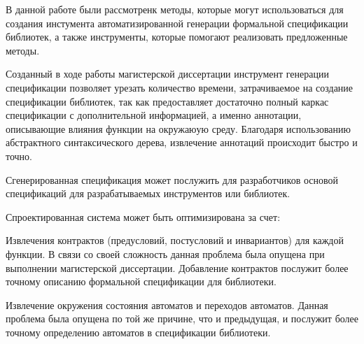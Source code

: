 \conclusion

В данной работе были рассмотренк методы, которые могут использоваться для создания инстумента автоматизированной генерации формальной спецификации библиотек, а также инструменты, которые помогают реализовать предложенные методы.

Созданный в ходе работы магистерской диссертации инструмент генерации спецификации позволяет урезать количество времени, затрачиваемое на создание спецификации библиотек, так как предоставляет достаточно полный каркас спецификации с дополнительной информацией, а именно аннотации, описывающие влияния функции на окружаюую среду.
Благодаря использованию абстрактного синтаксического дерева, извлечение аннотаций происходит быстро и точно.

Сгенерированная спецификация может послужить для разработчиков основой спецификаций для разрабатываемых инструментов или библиотек.

Спроектированная система может быть оптимизирована за счет:
%
\begin{itemize*}
\item Извлечения контрактов (предусловий, постусловий и инвариантов) для каждой функции. В связи со своей сложность данная проблема была опущена при выполнении магистерской диссертации. Добавление контрактов послужит более точному описанию формальной спецификации для библиотеки.
\item Извлечение окружения состояния автоматов и переходов автоматов. Данная проблема была опущена по той же причине, что и предыдущая, и послужит более точному определению автоматов в спецификации библиотеки.
\end{itemize*}
%
